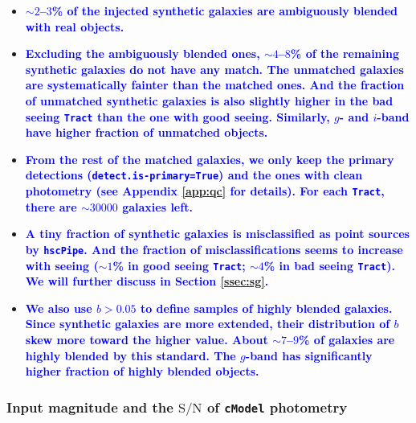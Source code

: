 \documentclass[useamsfonts]{pasj01}
\def\hscpipe{\texttt{hscPipe}}
\def\cmodel{\texttt{cModel}}
\def\tract{\texttt{Tract}}
\newcommand{\plan}[1]{\textcolor{blue} {\textbf{#1}}}
\begin{document}
    \begin{itemize}
    
        \item \plan{${\sim}2$--$3$\% of the injected synthetic galaxies are 
            ambiguously blended with real objects.}
            
        \item \plan{Excluding the ambiguously blended ones, ${\sim}4$--$8$\% of the 
            remaining synthetic galaxies do not have any match.
            The unmatched galaxies are systematically fainter than the matched ones.
            And the fraction of unmatched synthetic galaxies is also slightly higher 
            in the bad seeing \tract{} than the one with good seeing.
            Similarly, $g$- and $i$-band have higher fraction of unmatched objects.
            }
            
       \item \plan{From the rest of the matched galaxies, we only keep the primary 
           detections (\texttt{detect.is-primary=True}) and the ones with clean 
           photometry (see Appendix \ref{app:qc} for details). 
           For each \tract{}, there are ${\sim}30000$ galaxies left.}
           
       \item \plan{A tiny fraction of synthetic galaxies is misclassified as 
           point sources by \hscpipe{}. 
           And the fraction of misclassifications seems to increase with seeing 
           (${\sim}1$\% in good seeing \tract{}; ${\sim}4$\% in bad seeing \tract{}). 
           We will further discuss in Section \ref{ssec:sg}.}
           
       \item \plan{We also use $b>0.05$ to define samples of highly blended galaxies.
           Since synthetic galaxies are more extended, their distribution of $b$
           skew more toward the higher value. 
           About ${\sim}7$--$9$\% of galaxies are highly blended by this standard.
           The $g$-band has significantly higher fraction of highly blended objects.} 
    
    \end{itemize}
    
\subsubsection{Input magnitude and the $\mathrm{S}/\mathrm{N}$ of \cmodel{} photometry}
\end{document}
